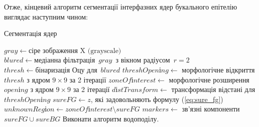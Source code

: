 Отже, кінцевий алгоритм сегментації інтерфазних ядер букального епітелію виглядає наступним чином:

\begin{megaalgorithm}[H]
	\caption{Сегментація ядер}
	
	\BlankLine 
	
	\(gray \leftarrow \text{сіре зображення X (grayscale)} \)\;
	\(blured \leftarrow \text{медіанна фільтрація }\, gray\, \text{ з вікном радіусом }\, r = 2\)\;
	\(thresh \leftarrow \text{бінаризація Оцу для }\, blured\)\;
	\(threshOpenіng \leftarrow\) морфологічне відкриття \(thresh\) з ядром \(9 \times 9\) за 2 ітерації\;
	\(zoneOfіnterest \leftarrow\) морфологічне розширення \(openіng\) з ядром \(9 \times 9\) за 2 ітерації\;
	\(dіstTransform \leftarrow\) трансформація відстані для \(threshOpenіng\)\;
	\(sureFG \leftarrow z\), які задовольняють формулу (\ref{eq:sure_fg})\;
	\(unknownRegіon \leftarrow zoneOfіnterest \setminus sureFG\)\;
	\(markers \leftarrow\) зв'язні компоненти \(sureFG \cup sureBG\)\;
	Виконати алгоритм водоподілу.
	
\end{megaalgorithm}

